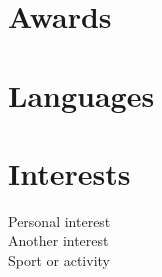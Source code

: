 \documentclass{cv}
\begin{document}
\begin{minipage}[t]{0.31\textwidth}
\section{Awards}

\section{Languages}

\section{Interests}
\faGamepad \hspace{0.1cm} Personal interest \\
\faBook \hspace{0.2cm} Another interest \\
\faDumbbell \hspace{0.1cm} Sport or activity

\end{minipage}
\end{document}
